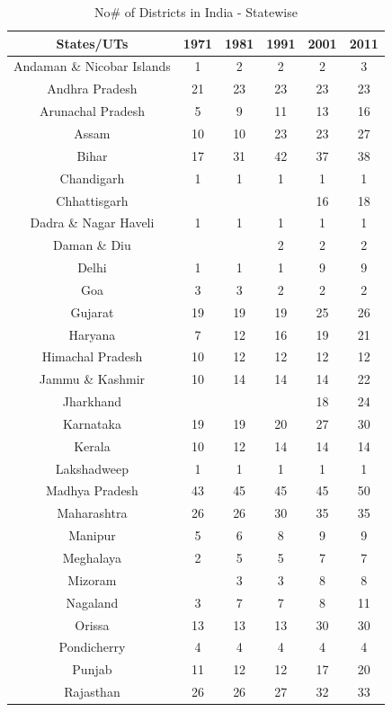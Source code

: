 \documentclass[12pt, a4paper]{article}
\begin{document}
\begin{table}[h!]
	\centering
	\caption{No\# of Districts in India - Statewise}
	\label{Fig2}
	\begin{tabular}{c|ccccc} 
		\hline
		States/UTs & 1971 & 1981 & 1991 & 2001 & 2011 \\
		\hline 
		Andaman \& Nicobar Islands & 1 & 2 & 2 & 2 & 3 \\ 
		Andhra Pradesh & 21 & 23 & 23 & 23 & 23 \\ 
		Arunachal Pradesh & 5 & 9 & 11 & 13 & 16 \\ 
		Assam & 10 & 10 & 23 & 23 & 27 \\ 
		Bihar & 17 & 31 & 42 & 37 & 38 \\ 
		Chandigarh & 1 & 1 & 1 & 1 & 1 \\ 
		Chhattisgarh &  &  &  & 16 & 18 \\ 
		Dadra \& Nagar Haveli & 1 & 1 & 1 & 1 & 1 \\ 
		Daman \& Diu &  &  & 2 & 2 & 2 \\ 
		Delhi & 1 & 1 & 1 & 9 & 9 \\ 
		Goa & 3 & 3 & 2 & 2 & 2 \\ 
		Gujarat & 19 & 19 & 19 & 25 & 26 \\ 
		Haryana & 7 & 12 & 16 & 19 & 21 \\ 
		Himachal Pradesh & 10 & 12 & 12 & 12 & 12 \\ 
		Jammu \& Kashmir & 10 & 14 & 14 & 14 & 22 \\ 
		Jharkhand &  &  &  & 18 & 24 \\ 
		Karnataka & 19 & 19 & 20 & 27 & 30 \\ 
		Kerala & 10 & 12 & 14 & 14 & 14 \\ 
		Lakshadweep & 1 & 1 & 1 & 1 & 1 \\ 
		Madhya Pradesh & 43 & 45 & 45 & 45 & 50 \\ 
		Maharashtra & 26 & 26 & 30 & 35 & 35 \\ 
		Manipur & 5 & 6 & 8 & 9 & 9 \\ 
		Meghalaya & 2 & 5 & 5 & 7 & 7 \\ 
		Mizoram &  & 3 & 3 & 8 & 8 \\ 
		Nagaland & 3 & 7 & 7 & 8 & 11 \\ 
		Orissa & 13 & 13 & 13 & 30 & 30 \\ 
		Pondicherry & 4 & 4 & 4 & 4 & 4 \\ 
		Punjab & 11 & 12 & 12 & 17 & 20 \\ 
		Rajasthan & 26 & 26 & 27 & 32 & 33 \\ 

\end{tabular}
\end{table}
\end{document}
